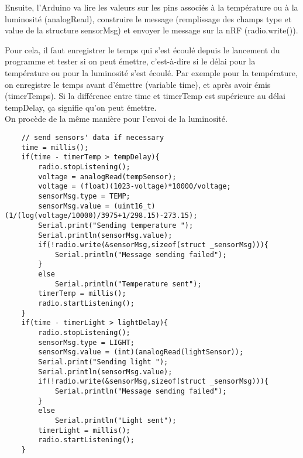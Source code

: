 Ensuite, l'Arduino va lire les valeurs sur les pins associés à la température ou à la
luminosité (analogRead), construire le message (remplissage des champs type et value
de la structure sensorMsg) et envoyer le message sur la nRF (radio.write()).

Pour cela, il faut enregistrer le temps qui s'est écoulé depuis le lancement du programme
et tester si on peut émettre, c'est-à-dire si le délai pour la température ou pour la
luminosité s'est écoulé. Par exemple pour la température, on enregistre le temps avant 
d'émettre (variable time), et après avoir émis (timerTemps). 
Si la différence entre time et timerTemp est supérieure au délai tempDelay, ça signifie qu'on
peut émettre.\\

On procède de la même manière pour l'envoi de la luminosité.

\bigbreak
\begin{DDbox}{\linewidth}
\begin{lstlisting}
	// send sensors' data if necessary
	time = millis();
	if(time - timerTemp > tempDelay){
		radio.stopListening();
		voltage = analogRead(tempSensor);
		voltage = (float)(1023-voltage)*10000/voltage;
		sensorMsg.type = TEMP;
		sensorMsg.value = (uint16_t)(1/(log(voltage/10000)/3975+1/298.15)-273.15);
		Serial.print("Sending temperature ");
		Serial.println(sensorMsg.value);
		if(!radio.write(&sensorMsg,sizeof(struct _sensorMsg))){
			Serial.println("Message sending failed");
		}
		else
			Serial.println("Temperature sent");
		timerTemp = millis();
		radio.startListening();   
	}
	if(time - timerLight > lightDelay){
		radio.stopListening();
		sensorMsg.type = LIGHT;
		sensorMsg.value = (int)(analogRead(lightSensor));
		Serial.print("Sending light ");
		Serial.println(sensorMsg.value);
		if(!radio.write(&sensorMsg,sizeof(struct _sensorMsg))){
			Serial.println("Message sending failed");
		}
		else
			Serial.println("Light sent");
		timerLight = millis();
		radio.startListening();
	}

\end{lstlisting}
\end{DDbox}
